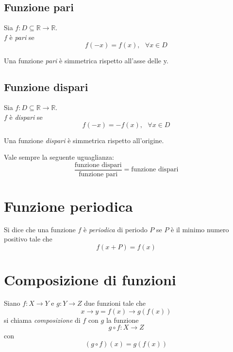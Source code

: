 \documentclass[a4paper,12pt, oneside]{book}
\begin{document}
\subsection{Funzione pari}
\begin{definizione}
Sia $f:D\subseteq \mathbb{R} \rightarrow \mathbb{R}$.\\
$f$ è \emph{pari} se 
\begin{equation}
	f(-x)=f(x), \mbox{ } \forall x \in D
\end{equation}
\end{definizione}
\begin{nota}
Una funzione \emph{pari} è simmetrica rispetto all'asse delle y.
\end{nota}
\subsection{Funzione dispari}
\begin{definizione}
Sia $f:D\subseteq \mathbb{R} \rightarrow \mathbb{R}$.\\
$f$ è \emph{dispari} se 
\begin{equation}
	f(-x)=-f(x), \mbox{ } \forall x \in D
\end{equation}
\end{definizione}
\begin{nota}
Una funzione \emph{dispari} è simmetrica rispetto all'origine.
\end{nota}
\begin{shaded}
\begin{nota}
Vale sempre la seguente uguaglianza:
$$\frac{\mbox{funzione dispari}}{\mbox{funzione pari}} = \mbox{funzione dispari}$$
\end{nota}	
\end{shaded}
\section{Funzione periodica}
\begin{definizione}
Si dice che una funzione $f$ è \emph{periodica} di periodo $P$ se $P$ è il minimo numero positivo tale che
\begin{equation}
f(x+P) = f(x)
\end{equation}
\end{definizione}
\section{Composizione di funzioni}
\begin{definizione}
Siano $f: X \rightarrow Y$ e $g: Y \rightarrow Z$ due funzioni tale che 
\begin{equation}
x \longrightarrow y = f(x) \longrightarrow g(f(x))
\end{equation}
si chiama \emph{composizione} di $f$ con $g$ la funzione
\begin{equation}
g \circ f: X\rightarrow Z
\end{equation} 
con 
\begin{equation}
(g\circ f)(x)=g(f(x))
\end{equation}
\end{definizione}
\end{document}
